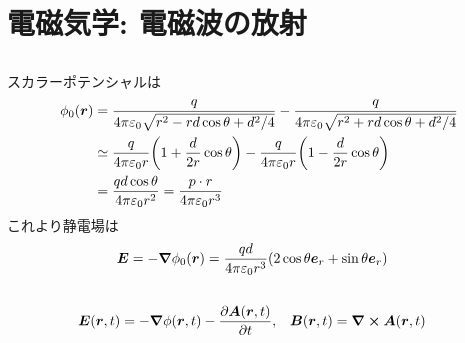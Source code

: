 \documentclass[../../sp_2017.tex]{subfiles}
\begin{document}
\setcounter{section}{2}
\section{電磁気学: 電磁波の放射}
\subsection{}
スカラーポテンシャルは
\begin{equation}\begin{aligned}[b]
    \phi_0(\vb*{r})
    &=\frac{q}{4\pi\varepsilon_0\sqrt{r^2-rd\cos\theta +d^2/4}}-\frac{q}{4\pi\varepsilon_0\sqrt{r^2+rd\cos\theta +d^2/4}}\\
    &\simeq\frac{q}{4\pi\varepsilon_0 r}\qty(1+\frac{d}{2r}\cos\theta)-\frac{q}{4\pi\varepsilon_0r}\qty(1-\frac{d}{2r}\cos\theta)\\
    &= \frac{qd\cos\theta}{4\pi\varepsilon_0 r^2}
    =\frac{p\cdot r}{4\pi\varepsilon_0 r^3}
\end{aligned}\end{equation}
これより静電場は
\begin{equation}\begin{aligned}[b]
    \vb*{E} &= -\grad \phi_0(\vb*{r}) = \frac{qd}{4\pi\varepsilon_0r^3}\qty(2\cos\theta\vb*{e}_r+\sin\theta\vb*{e}_r)
\end{aligned}\end{equation}


\subsection{}
\begin{equation}\begin{aligned}[b]
    \vb*{E}(\vb*{r},t) &= -\grad\phi(\vb*{r},t)-\pdv{\vb*{A}(\vb*{r},t)}{t}, & \vb*{B}(\vb*{r},t) &= \curl \vb*{A}(\vb*{r},t)
\end{aligned}\end{equation}
\end{document}
